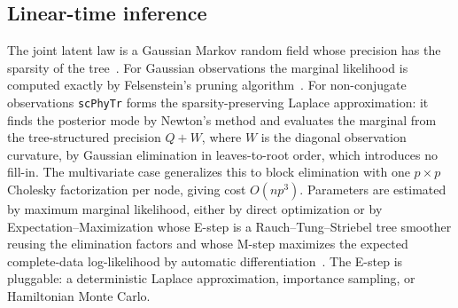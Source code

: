 \documentclass{article}
\newcommand{\scphytr}{\texttt{scPhyTr}}
\begin{document}
\subsection*{Linear-time inference}
The joint latent law is a Gaussian Markov random field whose precision has the sparsity of
the tree~\cite{rue_held_2005}. For Gaussian observations the marginal likelihood is
computed exactly by Felsenstein's pruning algorithm~\cite{felsenstein_pruning_1973,
felsenstein_contrasts_1985}. For non-conjugate observations \scphytr{} forms the
sparsity-preserving Laplace approximation: it finds the posterior mode by Newton's method
and evaluates the marginal from the tree-structured precision $Q+W$, where $W$ is the
diagonal observation curvature, by Gaussian elimination in leaves-to-root order, which
introduces no fill-in. The multivariate case generalizes this to block elimination with one
$p\times p$ Cholesky factorization per node, giving cost $O(np^3)$. Parameters are estimated
by maximum marginal likelihood, either by direct optimization or by Expectation--Maximization
whose E-step is a Rauch--Tung--Striebel tree smoother reusing the elimination factors and
whose M-step maximizes the expected complete-data log-likelihood by automatic
differentiation~\cite{dempster_em_1977, bradbury_jax_2018}. The E-step is pluggable: a
deterministic Laplace approximation, importance sampling, or Hamiltonian Monte Carlo.
\end{document}

